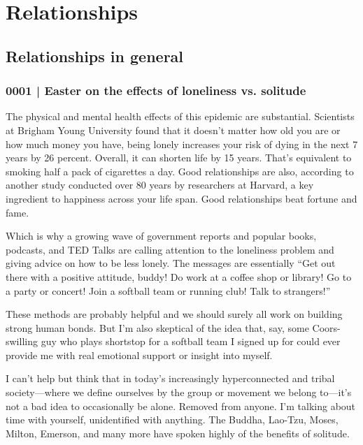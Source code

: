 \section{Relationships}
	\label{GM-RELATIONSHIPS}
	
	\subsection{Relationships in general}
		\label{GM-RELATIONSHIPS-ALL}
		
		\subsubsection{0001 | Easter on the effects of loneliness vs. solitude}
			\label{GM-RELATIONSHIPS-ALL-0001}
			
			The physical and mental health effects of this epidemic are substantial. Scientists at Brigham Young University found that it doesn't matter how old you are or how much money you have, being lonely increases your risk of dying in the next 7 years by 26 percent. Overall, it can shorten life by 15 years. That's equivalent to smoking half a pack of cigarettes a day. Good relationships are also, according to another study conducted over 80 years by researchers at Harvard, a key ingredient to happiness across your life span. Good relationships beat fortune and fame. 

			Which is why a growing wave of government reports and popular books, podcasts, and TED Talks are calling attention to the loneliness problem and giving advice on how to be less lonely. The messages are essentially ``Get out there with a positive attitude, buddy! Do work at a coffee shop or library! Go to a party or concert! Join a softball team or running club! Talk to strangers!'' 

			These methods are probably helpful and we should surely all work on building strong human bonds. But I'm also skeptical of the idea that, say, some Coors-swilling guy who plays shortstop for a softball team I signed up for could ever provide me with real emotional support or insight into myself. 
			
			I can't help but think that in today's increasingly hyperconnected and tribal society---where we define ourselves by the group or movement we belong to---it's not a bad idea to occasionally be alone. Removed from anyone. I'm talking about time with yourself, unidentified with anything. The Buddha, Lao-Tzu, Moses, Milton, Emerson, and many more have spoken highly of the benefits of solitude.

